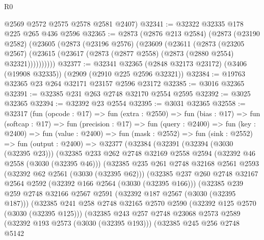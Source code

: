 \begin{lexlean}{R0}
\begin{coremodule}
      @2569
      @2572
      @2575
      @2578
      @2581
      @2407)
@32341 := @32322 @32335 @178 @225 @265 @436 @2596
@32365 := @2873
    (@2876 @213 @2584)
    (@2873
      (@23190 @2582)
      (@23605
        (@2873
          (@23196 @2576)
          (@23609
            (@23611
              (@2873
                (@23205 @2567)
                (@23615 (@23617 (@2873 (@2877 @2558) (@2873 (@2880 @2554) @32321))))))))))
@32377 := @32341
    @32365
    (@2848 @32173 @23172)
    (@3406 (@19908 @32335))
    (@2909 (@2910 @225 @2596 @32321))
@32384 := @19763 @32365 @23 @264 @32171 @23157 @2596 @23172
@32385 := @3016 @32365
@32391 := @32385 @231 @263 @2748 @32170 @2554 @2595
@32392 := @3025 @32365
@32394 := @32392 @23 @2554
@32395 := @3031 @32365
@32558 := @32317
    (fun (opcode : @17) =>
    fun (extra : @2550) =>
    fun (bias : @17) =>
    fun (softcap : @17) =>
    fun (precision : @17) =>
    fun (query : @2400) =>
    fun (key : @2400) =>
    fun (value : @2400) =>
    fun (mask : @2552) =>
    fun (sink : @2552) =>
    fun (output : @2400) =>
    @32377
      (@32384
        (@32391
          (@32394 (@3030 (@32395 @23)))
          (@32385
            @233
            @262
            @2748
            @32169
            @2558
            @2594
            (@32392 @46 @2558 (@3030 (@32395 @46)))
            (@32385
              @235
              @261
              @2748
              @32168
              @2561
              @2593
              (@32392 @62 @2561 (@3030 (@32395 @62)))
              (@32385
                @237
                @260
                @2748
                @32167
                @2564
                @2592
                (@32392 @166 @2564 (@3030 (@32395 @166)))
                (@32385
                  @239
                  @259
                  @2748
                  @32166
                  @2567
                  @2591
                  (@32392 @187 @2567 (@3030 (@32395 @187)))
                  (@32385
                    @241
                    @258
                    @2748
                    @32165
                    @2570
                    @2590
                    (@32392 @125 @2570 (@3030 (@32395 @125)))
                    (@32385
                      @243
                      @257
                      @2748
                      @23068
                      @2573
                      @2589
                      (@32392 @193 @2573 (@3030 (@32395 @193)))
                      (@32385
                        @245
                        @256
                        @2748
                        @5142

\end{coremodule}
\end{lexlean}
